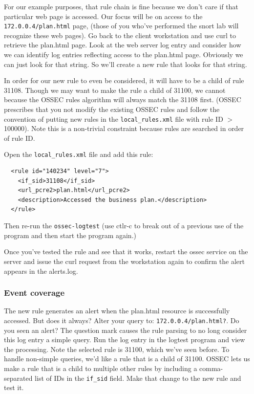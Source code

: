For our example purposes, that rule chain is fine because we don't care if that particular web page is accessed.  Our focus will
be on access to the {\tt 172.0.0.4/plan.html} page, (those of you who've performed the snort lab will recognize
these web pages).   Go back to the client workstation and use curl to retrieve the plan.html page.  Look at the 
web server log entry and consider how we can identify log entries reflecting access to the plan.html page.  
Obviously we can just look for that string.  So we'll create a new rule that looks for that string.

In order for our new rule to even be considered, it will have to be a child of rule 31108.  Though we may want to 
make the rule a child of 31100, we cannot because the OSSEC rules algorithm will always match the 31108 first. 
(OSSEC prescribes that you not
modify the existing OSSEC rules and follow the convention of putting new rules in the {\tt local\_rules.xml} file
with rule ID $>$ 100000).  Note this is a non-trivial constraint because rules are searched in order of rule ID.

Open the {\tt local\_rules.xml} file and add this rule:
\begin{verbatim}
  <rule id="140234" level="7">
    <if_sid>31108</if_sid>
    <url_pcre2>plan.html</url_pcre2>
    <description>Accessed the business plan.</description>
  </rule>

\end{verbatim}
Then re-run the {\tt ossec-logtest} (use ctlr-c to break out of a previous use of the program and then start the program
again.)

Once you've tested the rule and see that it works, restart the ossec service on the server and issue the curl request from 
the workstation again to confirm the alert appears in the alerts.log.

\subsubsection{Event coverage}
The new rule generates an alert when the plan.html resource is successfully accessed.  But does it always?
Alter your query to: {\tt 172.0.0.4/plan.html?}.  Do you seen an alert?  The question mark causes the rule parsing
to no long consider this log entry a simple query.  Run the log entry in the logtest program and view the processing.
Note the selected rule is 31100, which we've seen before.  To handle non-simple queries, we'd like a rule that is a
child of 31100.  OSSEC lets us make a rule that is a child to multiple other rules by including a comma-separated list
of IDs in the {\tt if\_sid} field.   Make that change to the new rule and test it.

